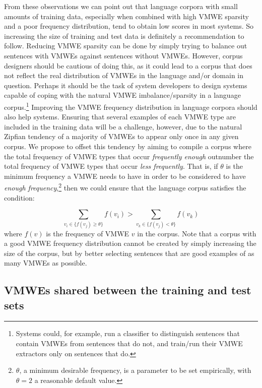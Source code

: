 \documentclass[output=paper
,modfonts
,nonflat,draftmode]{langsci/langscibook}
\begin{document}
From these observations we can point out that language corpora with small amounts of training data, especially when combined with high VMWE sparsity and a poor frequency distribution, tend to obtain low scores in most systems. So increasing the size of training and test data is definitely a recommendation to follow. Reducing VMWE sparsity can be done by simply trying to balance out sentences with VMWEs against sentences without VMWEs. However, corpus designers should be cautious of doing this, as it could lead to a corpus that does not reflect the real distribution of VMWEs in the language and/or domain in question. Perhaps it should be the task of system developers to design systems capable of coping with the natural VMWE imbalance/sparsity in a language corpus.\footnote{Systems could, for example, run a classifier to distinguish sentences that contain VMWEs from sentences that do not, and train/run their VMWE extractors only on sentences that do.} Improving the VMWE frequency distribution in language corpora should also help systems. Ensuring that several examples of each VMWE type are included in the training data will be a challenge, however, due to the natural Zipfian tendency of a majority of VMWEs to appear only once in any given corpus. We propose to offset this tendency by aiming to compile a corpus where the total frequency of VMWE types that occur \emph{frequently enough} outnumber the total frequency of VMWE types that occur \emph{less frequently}. That is, if $\theta$ is the minimum frequency a VMWE needs to have in order to be considered to have \emph{enough frequency},\footnote{$\theta$, a minimum desirable frequency, is a parameter to be set empirically, with $\theta=2$ a reasonable default value.} then we could ensure that the language corpus satisfies the condition:

\[
\sum_{v_{i}\in\{f(v_{j})\geq\theta\}}f(v_{i})>\sum_{v_{k}\in\{f(v_{j})<\theta\}}f(v_{k})
\]
where $f(v)$ is the frequency of VMWE $v$ in the corpus. Note that a corpus with a good VMWE frequency distribution cannot be created by simply increasing the size of the corpus, but by better selecting sentences that are good examples of as many VMWEs as possible. 

\subsection{\label{sec:shared}VMWEs shared between the training and test sets}
\end{document}
